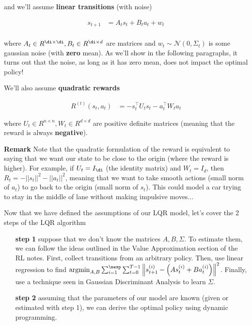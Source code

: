 \documentclass{article}
\begin{document}
and we'll assume \textbf{linear transitions} (with noise)


\begin{align*}
	 s_{t+1} &= A_t s_t + B_t a_t + w_t\\
\end{align*}

where $ A_t \in R^{\di\times \di}, B_t \in R^{\di \times d} $ are matrices and $ w_t \sim \mathcal{N}(0, \Sigma_t)  $ is some gaussian noise (with \textbf{zero} mean). As we'll show in the following paragraphs, it turns out that the noise, as long as it has zero mean, does not impact the optimal policy!

We'll also assume \textbf{quadratic rewards}

\begin{align*}
		R^{(t)}(s_t, a_t)& = - s_t^\top U_t s_t - a_t^\top W_t a_t
\end{align*}

where $ U_t \in R^{n \times n }, W_t \in R^{d \times d}$  are positive definite matrices (meaning that the reward is always \textbf{negative}). 

\vspace{1cm}

\textbf{Remark} Note that the quadratic formulation of the reward is equivalent to saying that we want our state to be close to the origin (where the reward is higher). For example, if $ U_t = I_{\di} $ (the identity matrix) and $ W_t = I_d $, then $ R_t = - || s_t ||^2 - ||a_t ||^2 $, meaning that we want to take smooth actions (small norm of $ a_t $) to go back to the origin  (small norm of $ s_t $). This could model a car trying to stay in the middle of lane without making impulsive moves...

\vspace{0.5cm}

Now that we have defined the assumptions of our LQR model, let's cover the 2 steps of the LQR algorithm

\begin{enumerate}
	\item[\textbf{step 1}] suppose that we don't know the matrices $ A, B, \Sigma $. To estimate them, we can follow the ideas outlined in the Value Approximation section of the RL notes. First, collect transitions from an arbitrary policy. Then, use linear regression to find $ \operatorname{argmin}_{A,B} \sum_{i=1}^\nexp \sum_{t=0}^{T-1} \left\| s^{(i)}_{t+1} - \left(A s^{(i)}_t + B a^{(i)}_t\right) \right\|^2$. Finally, use a technique seen in Gaussian Discriminant Analysis to learn $ \Sigma $.
	\item[\textbf{step 2}] assuming that the parameters of our model are known (given or estimated with step 1), we can derive the optimal policy using dynamic programming.
\end{enumerate}
\end{document}

